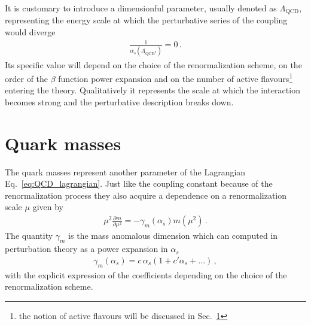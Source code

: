 It is customary to introduce a dimensionful parameter, usually denoted as $\Lambda_{\text{QCD}}$, representing the energy 
scale at which the perturbative series of the coupling would diverge
\begin{align}
    \label{eq:lambda_QCD}
    \frac{1}{\alpha_s\left(\Lambda_{\text{QCD}^2}\right)} = 0\,.
\end{align}
Its specific value will depend on the choice of the renormalization scheme, on the order
of the $\beta$ function power expansion and on the number of active flavours\footnote{the notion of active flavours will
be discussed in Sec.~\ref{sec:quark_masses}} entering the theory.
Qualitatively it represents the scale at which the interaction becomes strong and the perturbative description breaks down.

\section{Quark masses}
\label{sec:quark_masses}
The quark masses represent another parameter of the Lagrangian Eq.~\eqref{eq:QCD_lagrangian}.
Just like the coupling constant because of the renormalization process they also acquire a
dependence on a renormalization scale $\mu$ given by 
\begin{align}
    \label{eq:renormalization_mass}
    \mu^2\frac{\partial m }{\partial \mu^2} = - \gamma_m\left(\alpha_s\right)m\left(\mu^2\right)\,.
\end{align}
The quantity $\gamma_m$ is the mass anomalous dimension which can computed in perturbation theory as
a power expansion in $\alpha_s$
\begin{align}
    \gamma_m\left(\alpha_s\right) = c\,\alpha_s\left(1+c'\alpha_s + ...\right)\,,
\end{align}
with the explicit expression of the coefficients depending on the choice of the renormalization scheme.

